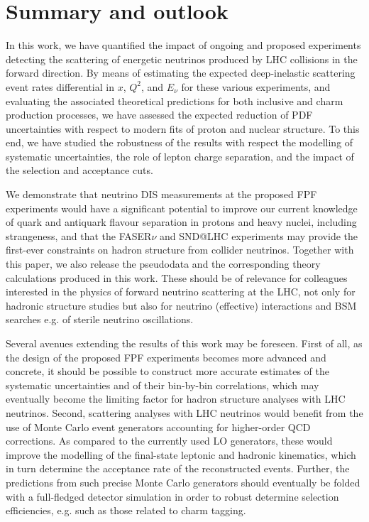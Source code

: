 \clearpage
\section{Summary and outlook}
\label{sec:summary}

In this work, we have quantified the impact of ongoing and proposed
experiments detecting the scattering of energetic neutrinos produced
by LHC collisions in the forward direction.
%
By means of estimating the expected deep-inelastic scattering
event rates differential
in $x$, $Q^2$, and $E_\nu$ for these various experiments, and
evaluating the associated theoretical predictions for
both inclusive and charm production processes, we have
assessed the expected reduction of PDF uncertainties with respect
to modern fits of proton and nuclear structure.
%
To this end, we have studied the robustness of the results
with respect the modelling of systematic uncertainties, the role of lepton
charge separation, and the impact of the selection and acceptance cuts.

We demonstrate that neutrino DIS measurements at the proposed FPF
experiments would have a significant potential to improve our current
knowledge of quark and antiquark flavour separation in protons
and heavy nuclei, including strangeness,
and that the FASER$\nu$ and SND@LHC
experiments may provide the first-ever
constraints on hadron structure from collider neutrinos.
%
Together with this paper, we also
release the pseudodata and the corresponding theory
calculations produced in this work.
%
These should be of relevance for colleagues interested in the physics
of forward
neutrino scattering at the LHC, not only for hadronic structure studies
but also for neutrino (effective)
interactions and BSM searches e.g. of sterile neutrino oscillations.

Several avenues extending the results of this work may be foreseen.
%
First of all, as the design of the proposed FPF experiments
becomes more advanced and concrete, it should be possible
to construct more accurate estimates of the systematic
uncertainties and of their bin-by-bin correlations,
which may eventually become the limiting factor
for hadron structure analyses with LHC neutrinos.
%
Second, scattering analyses with LHC neutrinos would benefit from
the use of Monte Carlo event generators accounting
for higher-order QCD corrections.
%
As compared to the currently used LO generators,
these would improve the modelling of the final-state leptonic
and hadronic kinematics, which in turn determine the acceptance rate
of the reconstructed events.
%
Further, the predictions from such precise Monte Carlo generators
should eventually be folded with a full-fledged detector simulation
in order to robust determine selection efficiencies, e.g.
such as those related to charm tagging.

